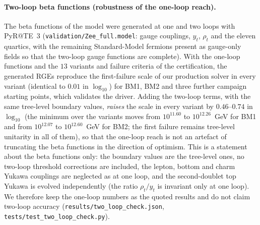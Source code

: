 \documentclass[twocolumn,epjc3]{svjour3}
\begin{document}
\paragraph{Two-loop beta functions (robustness of the one-loop reach).} The beta functions of the model were generated at one and two loops with PyR@TE~3 (\texttt{validation/Zee\_full.model}: gauge couplings, $y_t$, $\rho_t$ and the eleven quartics, with the remaining Standard-Model fermions present as gauge-only fields so that the two-loop gauge functions are complete). With the one-loop functions and the $13$ variants and failure criteria of the certification, the generated RGEs reproduce the first-failure scale of our production solver in every variant (identical to $0.01$ in $\log_{10}$) for BM1, BM2 and three further campaign starting points, which validates the driver. Adding the two-loop terms, with the same tree-level boundary values, \emph{raises} the scale in every variant by $0.46$--$0.74$ in $\log_{10}$ (the minimum over the variants moves from $10^{11.60}$ to $10^{12.26}$~GeV for BM1 and from $10^{12.07}$ to $10^{12.60}$~GeV for BM2; the first failure remains tree-level unitarity in all of them), so that the one-loop reach is not an artefact of truncating the beta functions in the direction of optimism. This is a statement about the beta functions only: the boundary values are the tree-level ones, no two-loop threshold corrections are included, the lepton, bottom and charm Yukawa couplings are neglected as at one loop, and the second-doublet top Yukawa is evolved independently (the ratio $\rho_t/y_t$ is invariant only at one loop). We therefore keep the one-loop numbers as the quoted results and do not claim two-loop accuracy (\texttt{results/two\_loop\_check.json}, \texttt{tests/test\_two\_loop\_check.py}).
\end{document}
